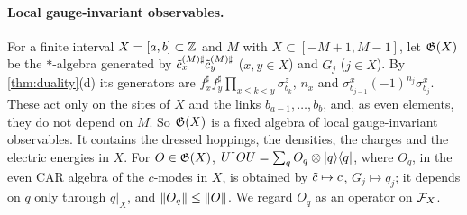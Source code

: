 \paragraph{Local gauge-invariant observables.}
For a finite interval $X=[a,b]\subset\mathbb{Z}$ and $M$ with $X\subset[-M+1,M-1]$, let $\mathfrak{G}(X)$ be the $*$-algebra generated
by $\tilde c^{(M)\sharp}_x\tilde c^{(M)\sharp}_y$ ($x,y\in X$) and $G_j$ ($j\in X$).  By \cref{thm:duality}(d) its generators are
$f^\sharp_xf^\sharp_y\prod_{x\le k<y}\sigma^z_{b_k}$, $n_x$ and $\sigma^x_{b_{j-1}}(-1)^{n_j}\sigma^x_{b_j}$.  These act only on
the sites of $X$ and the links $b_{a-1},\dots,b_b$, and, as even elements, they do not depend on $M$.  So
$\mathfrak{G}(X)$ is a fixed algebra of local gauge-invariant observables.  It contains the dressed hoppings, the densities,
the charges and the electric energies in $X$.  For $O\in\mathfrak{G}(X)$, $U^\dagger OU=\sum_qO_q\otimes|q\rangle\langle q|$, where
$O_q$, in the even CAR algebra of the $c$-modes in $X$, is obtained by $\tilde c\mapsto c$, $G_j\mapsto q_j$; it depends
on $q$ only through $q|_X$, and $\left\|O_q\right\|\le\left\|O\right\|$.  We regard $O_q$ as an operator on $\mathcal{F}_X$.

